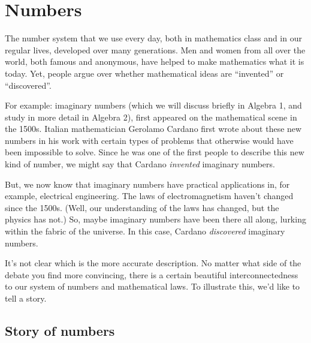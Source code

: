 \chapter{Numbers}
\label{ch:numbers}


The number system that we use every day, both in mathematics class and in our regular lives, developed over many generations. Men and women from all over the world, both famous and anonymous, have helped to make mathematics what it is today. Yet, people argue over whether mathematical ideas are ``invented'' or ``discovered''.

For example: \glspl{imaginary number} (which we will discuss briefly in Algebra 1, and study in more detail in Algebra 2), first appeared on the mathematical scene in the 1500s. Italian mathematician Gerolamo Cardano first wrote about these new numbers in his work with certain types of problems that otherwise would have been impossible to solve. Since he was one of the first people to describe this new kind of number, we might say that Cardano \textit{invented} imaginary numbers.

But, we now know that imaginary numbers have practical applications in, for example, electrical engineering. The laws of electromagnetism haven't changed since the 1500s. (Well, our understanding of the laws has changed, but the physics has not.) So, maybe imaginary numbers have been there all along, lurking within the fabric of the universe. In this case, Cardano \textit{discovered} imaginary numbers.

It's not clear which is the more accurate description. No matter what side of the debate you find more convincing, there is a certain beautiful interconnectedness to our system of numbers and mathematical laws. To illustrate this, we'd like to tell a story.

\section{Story of numbers}
\label{sec:storyofnumbers}

\newenvironment{story}
{\begin{slshape}}
{\end{slshape}}

